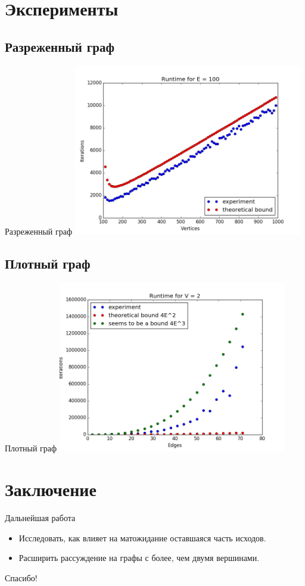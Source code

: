 \documentclass{beamer}
\begin{document}
 \section{Эксперименты}
 \subsection{Разреженный граф}
 \begin{frame}{Разреженный граф}
  \includegraphics[width=10cm]{pic/rarefied_graph.png}
 \end{frame}
 
 \subsection{Плотный граф}
 \begin{frame}{Плотный граф}
   \includegraphics[width=10cm]{pic/dense_graph.png}
 \end{frame}
 
 \section{Заключение}
 \begin{frame}{Дальнейшая работа}
   \begin{itemize}
    \item Исследовать, как влияет на матожидание оставшаяся часть исходов.
    \item Расширить рассуждение на графы с более, чем двумя вершинами.
   \end{itemize}
 \end{frame}
 
 \begin{frame}
  \begin{center}
   \Huge Спасибо!
  \end{center}

 \end{frame}
\end{document}
